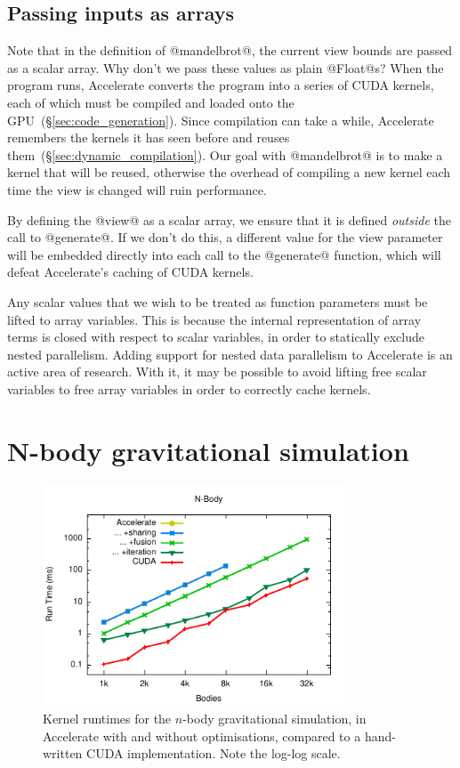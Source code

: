 \subsection{Passing inputs as arrays}

Note that in the definition of @mandelbrot@, the current view bounds are passed
as a scalar array. Why don't we pass these values as plain @Float@s? When the
program runs, Accelerate converts the program into a series of CUDA kernels,
each of which must be compiled and loaded onto the
GPU~(\S\ref{sec:code_generation}). Since compilation can take a while,
Accelerate remembers the kernels it has seen before and reuses
them~(\S\ref{sec:dynamic_compilation}). Our goal with @mandelbrot@ is to make a
kernel that will be reused, otherwise the overhead of compiling a new kernel
each time the view is changed will ruin performance.

By defining the @view@ as a scalar array, we ensure that it is defined
\emph{outside} the call to @generate@. If we don't do this, a different value
for the view parameter will be embedded directly into each call to the
@generate@ function, which will defeat Accelerate's caching of CUDA kernels.

Any scalar values that we wish to be treated as function parameters must be
lifted to array variables. This is because the internal representation of array
terms is closed with respect to scalar variables, in order to statically exclude
nested parallelism. Adding support for nested data parallelism to Accelerate is
an active area of research. With it, it may be possible to avoid lifting free
scalar variables to free array variables in order to correctly cache kernels.


\section{N-body gravitational simulation}
\label{sec:nbody}

\begin{figure}
    \begin{center}
        \includegraphics[width=0.8\textwidth]{images/results/nbody/nbody}
    \end{center}
    \caption[N-body gravitational simulation kernel benchmarks]{Kernel runtimes
        for the $n$-body gravitational simulation, in Accelerate with and
        without optimisations, compared to a hand-written CUDA implementation.
        Note the log-log scale.}
    \label{fig:nbody}
\end{figure}

